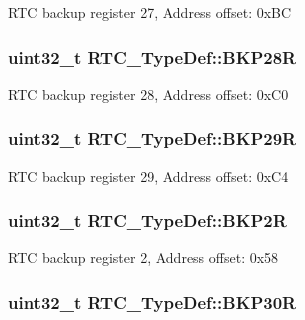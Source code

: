 R\-T\-C backup register 27, Address offset\-: 0x\-B\-C \hypertarget{struct_r_t_c___type_def_abd26829bfe028b5882d523e7035eb497}{
\subsubsection[{B\-K\-P28\-R}]{ uint32\-\_\-t R\-T\-C\-\_\-\-Type\-Def\-::\-B\-K\-P28\-R}}\label{struct_r_t_c___type_def_abd26829bfe028b5882d523e7035eb497}
R\-T\-C backup register 28, Address offset\-: 0x\-C0 \hypertarget{struct_r_t_c___type_def_aa240211cf23c5822f4ac9c690a7a248c}{
\subsubsection[{B\-K\-P29\-R}]{ uint32\-\_\-t R\-T\-C\-\_\-\-Type\-Def\-::\-B\-K\-P29\-R}}\label{struct_r_t_c___type_def_aa240211cf23c5822f4ac9c690a7a248c}
R\-T\-C backup register 29, Address offset\-: 0x\-C4 \hypertarget{struct_r_t_c___type_def_aa845c401b24d2ef1049f489f26d35626}{
\subsubsection[{B\-K\-P2\-R}]{ uint32\-\_\-t R\-T\-C\-\_\-\-Type\-Def\-::\-B\-K\-P2\-R}}\label{struct_r_t_c___type_def_aa845c401b24d2ef1049f489f26d35626}
R\-T\-C backup register 2, Address offset\-: 0x58 \hypertarget{struct_r_t_c___type_def_a32b51e2f18c68ea5af816d1f231b7ec6}{
\subsubsection[{B\-K\-P30\-R}]{ uint32\-\_\-t R\-T\-C\-\_\-\-Type\-Def\-::\-B\-K\-P30\-R}}\label{struct_r_t_c___type_def_a32b51e2f18c68ea5af816d1f231b7ec6}

